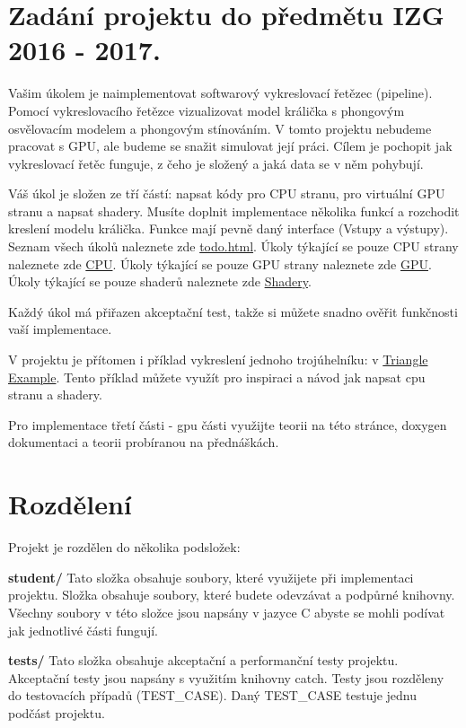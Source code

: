 \hypertarget{index_zadani}{}\section{Zadání projektu do předmětu I\+Z\+G 2016 -\/ 2017.}\label{index_zadani}


Vašim úkolem je naimplementovat softwarový vykreslovací řetězec (pipeline). Pomocí vykreslovacího řetězce vizualizovat model králička s phongovým osvělovacím modelem a phongovým stínováním. V tomto projektu nebudeme pracovat s G\+PU, ale budeme se snažit simulovat její práci. Cílem je pochopit jak vykreslovací řetěc funguje, z čeho je složený a jaká data se v něm pohybují.

Váš úkol je složen ze tří částí\+: napsat kódy pro C\+PU stranu, pro virtuální G\+PU stranu a napsat shadery. Musíte doplnit implementace několika funkcí a rozchodit kreslení modelu králička. Funkce mají pevně daný interface (Vstupy a výstupy). Seznam všech úkolů naleznete zde \hyperlink{todo}{todo.\+html}. Úkoly týkající se pouze C\+PU strany naleznete zde \hyperlink{group__cpu__side}{C\+PU}. Úkoly týkající se pouze G\+PU strany naleznete zde \hyperlink{group__gpu__side}{G\+PU}. Úkoly týkající se pouze shaderů naleznete zde \hyperlink{group__shader__side}{Shadery}.

Každý úkol má přiřazen akceptační test, takže si můžete snadno ověřit funkčnosti vaší implementace.

V projektu je přítomen i příklad vykreslení jednoho trojúhelníku\+: v \hyperlink{TriangleExample-example}{Triangle Example}. Tento příklad můžete využít pro inspiraci a návod jak napsat cpu stranu a shadery.

Pro implementace třetí části -\/ gpu části využijte teorii na této stránce, doxygen dokumentaci a teorii probíranou na přednáškách.\hypertarget{index_rozdeleni}{}\section{Rozdělení}\label{index_rozdeleni}
Projekt je rozdělen do několika podsložek\+:

{\bfseries student/} Tato složka obsahuje soubory, které využijete při implementaci projektu. Složka obsahuje soubory, které budete odevzávat a podpůrné knihovny. Všechny soubory v této složce jsou napsány v jazyce C abyste se mohli podívat jak jednotlivé části fungují.

{\bfseries tests/} Tato složka obsahuje akceptační a performanční testy projektu. Akceptační testy jsou napsány s využitím knihovny catch. Testy jsou rozděleny do testovacích případů (T\+E\+S\+T\+\_\+\+C\+A\+SE). Daný T\+E\+S\+T\+\_\+\+C\+A\+SE testuje jednu podčást projektu.

